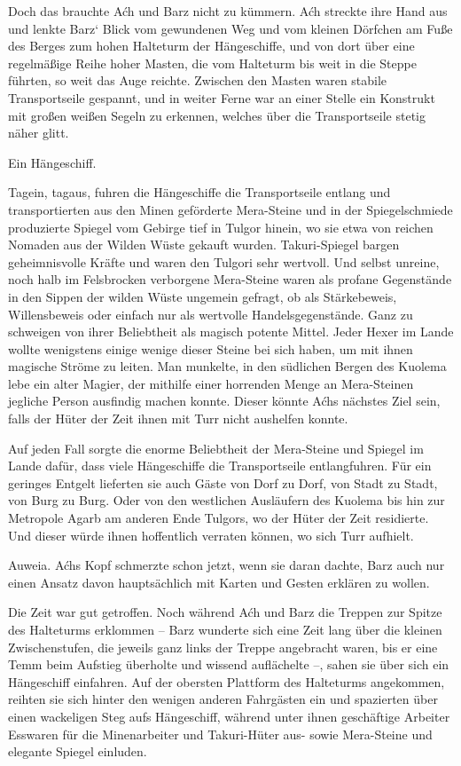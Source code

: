 Doch das brauchte Aćh und Barz nicht zu kümmern. Aćh streckte ihre Hand aus und lenkte Barz‘ Blick vom gewundenen Weg und vom kleinen Dörfchen am Fuße des Berges zum hohen Halteturm der Hängeschiffe, und von dort über eine regelmäßige Reihe hoher Masten, die vom Halteturm bis weit in die Steppe führten, so weit das Auge reichte. Zwischen den Masten waren stabile Transportseile gespannt, und in weiter Ferne war an einer Stelle ein Konstrukt mit großen weißen Segeln zu erkennen, welches über die Transportseile stetig näher glitt.

Ein Hängeschiff.

Tagein, tagaus, fuhren die Hängeschiffe die Transportseile entlang und transportierten aus den Minen geförderte Mera-Steine und in der Spiegelschmiede produzierte Spiegel vom Gebirge tief in Tulgor hinein, wo sie etwa von reichen Nomaden aus der Wilden Wüste gekauft wurden. Takuri-Spiegel bargen geheimnisvolle Kräfte und waren den Tulgori sehr wertvoll. Und selbst unreine, noch halb im Felsbrocken verborgene Mera-Steine waren als profane Gegenstände in den Sippen der wilden Wüste ungemein gefragt, ob als Stärkebeweis, Willensbeweis oder einfach nur als wertvolle Handelsgegenstände. Ganz zu schweigen von ihrer Beliebtheit als magisch potente Mittel. Jeder Hexer im Lande wollte wenigstens einige wenige dieser Steine bei sich haben, um mit ihnen magische Ströme zu leiten. Man munkelte, in den südlichen Bergen des Kuolema lebe ein alter Magier, der mithilfe einer horrenden Menge an Mera-Steinen jegliche Person ausfindig machen konnte. Dieser könnte Aćhs nächstes Ziel sein, falls der Hüter der Zeit ihnen mit Turr nicht aushelfen konnte.

Auf jeden Fall sorgte die enorme Beliebtheit der Mera-Steine und Spiegel im Lande dafür, dass viele Hängeschiffe die Transportseile entlangfuhren. Für ein geringes Entgelt lieferten sie auch Gäste von Dorf zu Dorf, von Stadt zu Stadt, von Burg zu Burg. Oder von den westlichen Ausläufern des Kuolema bis hin zur Metropole Agarb am anderen Ende Tulgors, wo der Hüter der Zeit residierte. Und dieser würde ihnen hoffentlich verraten können, wo sich Turr aufhielt.

Auweia. Aćhs Kopf schmerzte schon jetzt, wenn sie daran dachte, Barz auch nur einen Ansatz davon hauptsächlich mit Karten und Gesten erklären zu wollen.



\trennzeichen



Die Zeit war gut getroffen. Noch während Aćh und Barz die Treppen zur Spitze des Halteturms erklommen – Barz wunderte sich eine Zeit lang über die kleinen Zwischenstufen, die jeweils ganz links der Treppe angebracht waren, bis er eine Temm beim Aufstieg überholte und wissend auflächelte –, sahen sie über sich ein Hängeschiff einfahren. Auf der obersten Plattform des Halteturms angekommen, reihten sie sich hinter den wenigen anderen Fahrgästen ein und spazierten über einen wackeligen Steg aufs Hängeschiff, während unter ihnen geschäftige Arbeiter Esswaren für die Minenarbeiter und Takuri-Hüter aus- sowie Mera-Steine und elegante Spiegel einluden.

